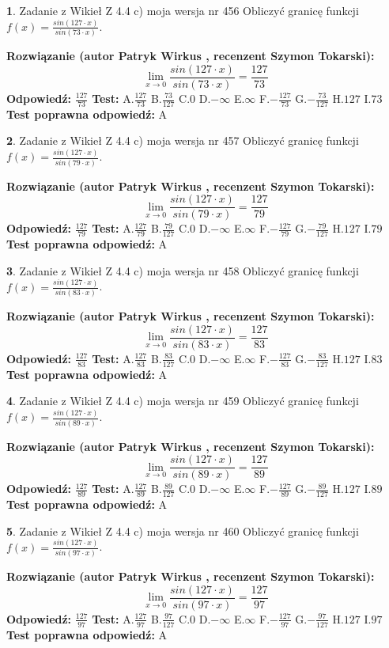 \documentclass[12pt, a4paper]{article}
\theoremstyle{definition} %
\newtheorem{zad}{}
\newcommand{\zadStart}[1]{\begin{zad}#1\newline}
\newcommand{\zadStop}{\end{zad}}
\newcommand{\rozwStart}[2]{\noindent \textbf{Rozwiązanie (autor #1 , recenzent #2): }\newline}
\newcommand{\rozwStop}{\newline}
\newcommand{\odpStart}{\noindent \textbf{Odpowiedź:}\newline}
\newcommand{\odpStop}{\newline}
\newcommand{\testStart}{\noindent \textbf{Test:}\newline}
\newcommand{\testStop}{\newline}
\newcommand{\kluczStart}{\noindent \textbf{Test poprawna odpowiedź:}\newline}
\newcommand{\kluczStop}{\newline}
\begin{document}
\zadStart{Zadanie z Wikieł Z 4.4 c) moja wersja nr 456}
Obliczyć granicę funkcji $f(x)=\frac{sin(127\cdot x)}{sin(73\cdot x)}$.
\zadStop
\rozwStart{Patryk Wirkus}{Szymon Tokarski}
$$\lim\limits_{x\to 0}\frac{sin(127\cdot x)}{sin(73\cdot x)}=
\frac{127}{73}$$
\rozwStop
\odpStart
$\frac{127}{73}$
\odpStop
\testStart
A.$\frac{127}{73}$
B.$\frac{73}{127}$
C.$0$
D.$-\infty$
E.$\infty$
F.$-\frac{127}{73}$
G.$-\frac{73}{127}$
H.$127$
I.$73$
\testStop
\kluczStart
A
\kluczStop



\zadStart{Zadanie z Wikieł Z 4.4 c) moja wersja nr 457}
Obliczyć granicę funkcji $f(x)=\frac{sin(127\cdot x)}{sin(79\cdot x)}$.
\zadStop
\rozwStart{Patryk Wirkus}{Szymon Tokarski}
$$\lim\limits_{x\to 0}\frac{sin(127\cdot x)}{sin(79\cdot x)}=
\frac{127}{79}$$
\rozwStop
\odpStart
$\frac{127}{79}$
\odpStop
\testStart
A.$\frac{127}{79}$
B.$\frac{79}{127}$
C.$0$
D.$-\infty$
E.$\infty$
F.$-\frac{127}{79}$
G.$-\frac{79}{127}$
H.$127$
I.$79$
\testStop
\kluczStart
A
\kluczStop



\zadStart{Zadanie z Wikieł Z 4.4 c) moja wersja nr 458}
Obliczyć granicę funkcji $f(x)=\frac{sin(127\cdot x)}{sin(83\cdot x)}$.
\zadStop
\rozwStart{Patryk Wirkus}{Szymon Tokarski}
$$\lim\limits_{x\to 0}\frac{sin(127\cdot x)}{sin(83\cdot x)}=
\frac{127}{83}$$
\rozwStop
\odpStart
$\frac{127}{83}$
\odpStop
\testStart
A.$\frac{127}{83}$
B.$\frac{83}{127}$
C.$0$
D.$-\infty$
E.$\infty$
F.$-\frac{127}{83}$
G.$-\frac{83}{127}$
H.$127$
I.$83$
\testStop
\kluczStart
A
\kluczStop



\zadStart{Zadanie z Wikieł Z 4.4 c) moja wersja nr 459}
Obliczyć granicę funkcji $f(x)=\frac{sin(127\cdot x)}{sin(89\cdot x)}$.
\zadStop
\rozwStart{Patryk Wirkus}{Szymon Tokarski}
$$\lim\limits_{x\to 0}\frac{sin(127\cdot x)}{sin(89\cdot x)}=
\frac{127}{89}$$
\rozwStop
\odpStart
$\frac{127}{89}$
\odpStop
\testStart
A.$\frac{127}{89}$
B.$\frac{89}{127}$
C.$0$
D.$-\infty$
E.$\infty$
F.$-\frac{127}{89}$
G.$-\frac{89}{127}$
H.$127$
I.$89$
\testStop
\kluczStart
A
\kluczStop



\zadStart{Zadanie z Wikieł Z 4.4 c) moja wersja nr 460}
Obliczyć granicę funkcji $f(x)=\frac{sin(127\cdot x)}{sin(97\cdot x)}$.
\zadStop
\rozwStart{Patryk Wirkus}{Szymon Tokarski}
$$\lim\limits_{x\to 0}\frac{sin(127\cdot x)}{sin(97\cdot x)}=
\frac{127}{97}$$
\rozwStop
\odpStart
$\frac{127}{97}$
\odpStop
\testStart
A.$\frac{127}{97}$
B.$\frac{97}{127}$
C.$0$
D.$-\infty$
E.$\infty$
F.$-\frac{127}{97}$
G.$-\frac{97}{127}$
H.$127$
I.$97$
\testStop
\kluczStart
A
\kluczStop
\end{document}

